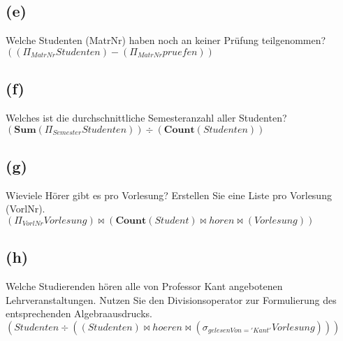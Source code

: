 \documentclass{article}
\begin{document}
\subsection{(e)}
Welche Studenten (MatrNr) haben noch an keiner Prüfung teilgenommen?\\
$((\Pi_{MatrNr} Studenten) - (\Pi_{MatrNr} pruefen))$\\

\subsection{(f)}
Welches ist die durchschnittliche Semesteranzahl aller Studenten?\\
$(\textbf{Sum}(\Pi_{Semester} Studenten)) \div  (\textbf{Count}(Studenten))$\\

\subsection{(g)}
Wieviele Hörer gibt es pro Vorlesung? Erstellen Sie eine Liste pro Vorlesung (VorlNr).\\
$(\Pi_{VorlNr} Vorlesung) \bowtie (\textbf{Count}(Student) \bowtie horen \bowtie (Vorlesung)) $


\subsection{(h)}
Welche Studierenden hören alle von Professor Kant angebotenen Lehrveranstaltungen. 
Nutzen Sie den Divisionsoperator zur Formulierung des entsprechenden Algebraausdrucks. \\

$ (Studenten \div ((Studenten) \bowtie hoeren \bowtie (\sigma_{gelesenVon='Kant'} Vorlesung)))$
\end{document}
